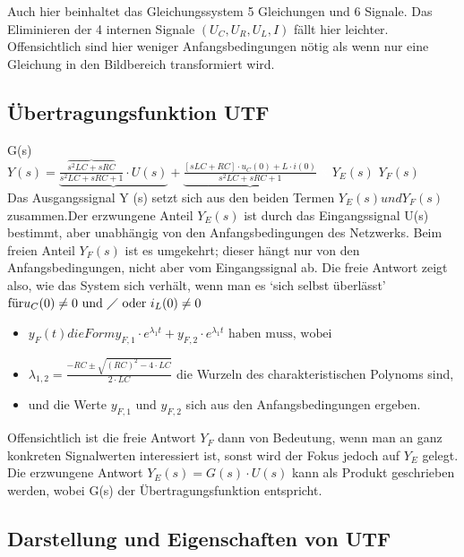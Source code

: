 Auch hier beinhaltet das Gleichungssystem 5 Gleichungen und 6 Signale. Das Eliminieren der 4 internen Signale $(U_{C}, U_{R}, U_{L}, I)$ fällt hier leichter. Offensichtlich sind hier weniger Anfangsbedingungen nötig als wenn nur eine Gleichung in den Bildbereich transformiert wird.

\subsection{Übertragungsfunktion UTF}
\hspace{2.3cm}G(s)\\
$Y(s) = \underbrace{\frac{\overbrace{s^2 LC+sRC}}{s^2 LC +sRC +1}\cdot U(s)} + \underbrace{\frac{[sLC + RC] \cdot u_{C}(0) + L \cdot i(0)}{s^2 LC +sRC +1}}$ \newline
\textcolor{white}{x} \hspace{2.4cm} $Y_{E}(s)$ \hspace{3.8cm} $Y_{F}(s)$ \\
Das Ausgangssignal Y (s) setzt sich aus den beiden Termen $Y_{E}(s) und Y_{F}(s)$ zusammen.Der erzwungene Anteil $Y_{E}(s)$ ist durch das Eingangssignal U(s) bestimmt, aber unabhängig von den Anfangsbedingungen des Netzwerks.
Beim freien Anteil $Y_{F}(s)$ ist es umgekehrt; dieser hängt nur von den Anfangsbedingungen,
nicht aber vom Eingangssignal ab. Die freie Antwort zeigt also, wie
das System sich verhält, wenn man es ‘sich selbst überlässt’
$\text{für} u_{C}(0) \neq 0 \text{ und } \diagup \text{ oder } i_{L}(0) \neq 0$
\begin{itemize}
	\item $ y_{F}(t) die Form y_{F,1} \cdot e^{\lambda_{1}t} + y_{F,2} \cdot e^{\lambda_{1}t} \text{ haben muss, wobei}$
	\item $ \lambda_{1,2}= \frac{-RC \pm \sqrt{(RC)^2 - 4 \cdot LC} }{2 \cdot LC}$ die Wurzeln des charakteristischen Polynoms sind,
	\item und die Werte $y_{F,1} \text{ und } y_{F,2}$ sich aus den Anfangsbedingungen ergeben.
\end{itemize}
Offensichtlich ist die freie Antwort $Y_{F}$ dann von Bedeutung, wenn man an ganz konkreten
Signalwerten interessiert ist, sonst wird der Fokus jedoch auf $Y_{E}$ gelegt. \\
Die erzwungene Antwort $Y_{E}(s) = G(s) \cdot U(s)$ kann als Produkt geschrieben werden,
wobei G(s) der Übertragungsfunktion entspricht.

\subsection{Darstellung und Eigenschaften von UTF}

